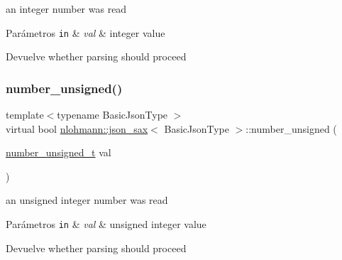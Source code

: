 an integer number was read 


\begin{DoxyParams}[1]{Parámetros}
\mbox{\tt in}  & {\em val} & integer value \\
\hline
\end{DoxyParams}
\begin{DoxyReturn}{Devuelve}
whether parsing should proceed 
\end{DoxyReturn}
\mbox{\label{structnlohmann_1_1json__sax_ad9b253083e0509923ba195136f49face}} 
\subsubsection{\texorpdfstring{number\+\_\+unsigned()}{number\_unsigned()}}
{\footnotesize\ttfamily template$<$typename Basic\+Json\+Type $>$ \\
virtual bool \mbox{\hyperlink{structnlohmann_1_1json__sax}{nlohmann\+::json\+\_\+sax}}$<$ Basic\+Json\+Type $>$\+::number\+\_\+unsigned (\begin{DoxyParamCaption}\item[{\mbox{\hyperlink{structnlohmann_1_1json__sax_a32028cc056ae0f43aaae331cdbbbf856}{number\+\_\+unsigned\+\_\+t}}}]{val }\end{DoxyParamCaption})\hspace{0.3cm}{\ttfamily [pure virtual]}}



an unsigned integer number was read 


\begin{DoxyParams}[1]{Parámetros}
\mbox{\tt in}  & {\em val} & unsigned integer value \\
\hline
\end{DoxyParams}
\begin{DoxyReturn}{Devuelve}
whether parsing should proceed 
\end{DoxyReturn}
\mbox{\label{structnlohmann_1_1json__sax_a60287e3bd85f489e04c83f7e3b76e613}} 
